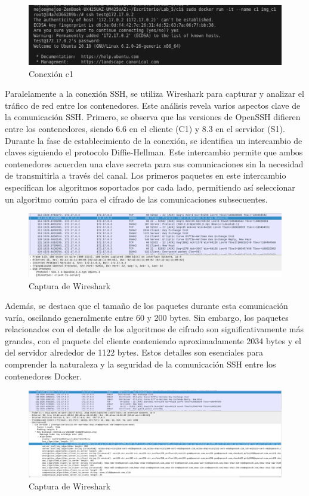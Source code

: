 \documentclass[letter,12pt]{article}
\begin{document}
    \begin{figure}[H]
        \centering
        \includegraphics[width=1\textwidth]{img/conecion_c1.png}    
        \caption{Conexión c1}
    \end{figure}

    Paralelamente a la conexión SSH, se utiliza Wireshark para capturar y analizar el tráfico de red entre los contenedores. Este análisis revela varios aspectos clave de la comunicación SSH. Primero, se observa que las versiones de OpenSSH difieren entre los contenedores, siendo 6.6 en el cliente (C1) y 8.3 en el servidor (S1). Durante la fase de establecimiento de la conexión, se identifica un intercambio de claves siguiendo el protocolo Diffie-Hellman. Este intercambio permite que ambos contenedores acuerden una clave secreta para sus comunicaciones sin la necesidad de transmitirla a través del canal. Los primeros paquetes en este intercambio especifican los algoritmos soportados por cada lado, permitiendo así seleccionar un algoritmo común para el cifrado de las comunicaciones subsecuentes.

    \begin{figure}[H]
        \centering
        \includegraphics[width=1\textwidth]{img/captura_wire.png}    
        \caption{Captura de Wireshark}
    \end{figure}
Además, se destaca que el tamaño de los paquetes durante esta comunicación varía, oscilando generalmente entre 60 y 200 bytes. Sin embargo, los paquetes relacionados con el detalle de los algoritmos de cifrado son significativamente más grandes, con el paquete del cliente conteniendo aproximadamente 2034 bytes y el del servidor alrededor de 1122 bytes. Estos detalles son esenciales para comprender la naturaleza y la seguridad de la comunicación SSH entre los contenedores Docker.
    \begin{figure}[H]
        \centering
        \includegraphics[width=1\textwidth]{img/algoritmos.png}    
        \caption{Captura de Wireshark}
    \end{figure}
\end{document}
